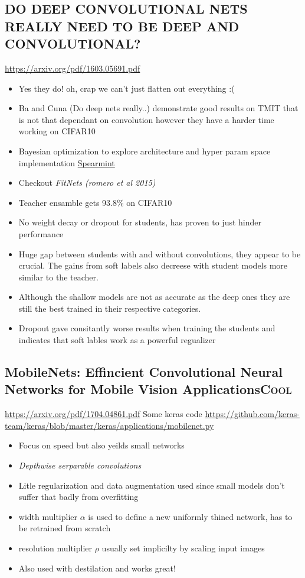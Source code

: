 \documentclass[11pt]{article}
\begin{document}
\subsection{DO DEEP CONVOLUTIONAL NETS REALLY NEED TO BE DEEP AND CONVOLUTIONAL?}
\label{sec:org354974a}
\url{https://arxiv.org/pdf/1603.05691.pdf}

\begin{itemize}
\item Yes they do! oh, crap we can't just flatten out everything :(
\item Ba and Cuna (Do deep nets really..) demonstrate good results on TMIT that is not that dependant on convolution however they have a harder time working on CIFAR10
\item Bayesian optimization to explore architecture and hyper param space implementation \href{https://github.com/JasperSnoek/spearmint}{Spearmint}
\item Checkout \emph{FitNets (romero et al 2015)}
\item Teacher ensamble gets 93.8\% on CIFAR10
\item No weight decay or dropout for students, has proven to just hinder performance
\item Huge gap between students with and without convolutions, they appear to be crucial. The gains from soft labels also decreese with student models more similar to the teacher.
\item Although the shallow models are not as accurate as the deep ones they are still the best trained in their respective categories.
\item Dropout gave consitantly worse results when training the students and indicates that soft lables work as a powerful regualizer
\end{itemize}
\subsection{MobileNets: Effincient Convolutional Neural Networks for Mobile Vision Applications\hfill{}\textsc{Cool}}
\label{sec:orgde04d1b}
\url{https://arxiv.org/pdf/1704.04861.pdf}
Some keras code \url{https://github.com/keras-team/keras/blob/master/keras/applications/mobilenet.py}
\begin{itemize}
\item Focus on speed but also yeilds small networks
\item \emph{Depthwise serparable convolutions}
\item Litle regularization and data augmentation used since small models don't suffer that badly from overfitting
\item width multiplier \(\alpha\) is used to define a new uniformly thined network, has to be retrained from scratch
\item resolution multiplier \(\rho\) usually set implicilty by scaling input images
\item Also used with destilation and works great!
\end{itemize}
\end{document}
